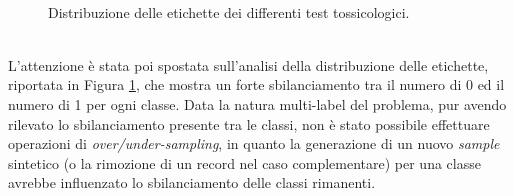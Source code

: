 \begin{figure}[!ht]
	\quad
	\\
	\quad
	\quad	{}\quad
	\caption{Distribuzione delle etichette dei differenti test tossicologici.}
	\label{fig:class_distribution}
\end{figure}
\\L'attenzione è stata poi spostata sull'analisi della distribuzione delle etichette, riportata in Figura \ref{fig:class_distribution}, che mostra un forte sbilanciamento tra il numero di 0 ed il numero di 1 per ogni classe. 
Data la natura multi-label del problema, pur avendo rilevato lo sbilanciamento presente tra le classi, non è stato possibile effettuare operazioni di \textit{over/under-sampling}, in quanto la generazione di un nuovo \textit{sample} sintetico (o la rimozione di un record nel caso complementare) per una classe avrebbe influenzato lo sbilanciamento delle classi rimanenti.
